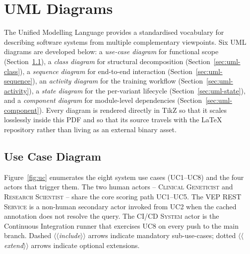 \documentclass[11pt,a4paper,oneside]{report}
\begin{document}
\section{UML Diagrams}
\label{sec:an-uml}

The Unified Modelling Language \citep{fowler2004uml}
provides a standardised vocabulary for describing
software systems from multiple complementary viewpoints.
Six UML diagrams are developed below: a \emph{use-case
diagram} for functional scope
(Section~\ref{sec:uml-usecase}), a \emph{class diagram}
for structural decomposition
(Section~\ref{sec:uml-class}), a \emph{sequence diagram}
for end-to-end interaction
(Section~\ref{sec:uml-sequence}), an \emph{activity
diagram} for the training workflow
(Section~\ref{sec:uml-activity}), a \emph{state diagram}
for the per-variant lifecycle (Section~\ref{sec:uml-state}),
and a \emph{component diagram} for module-level
dependencies (Section~\ref{sec:uml-component}). Every
diagram is rendered directly in TikZ so that it scales
losslessly inside this PDF and so that its source
travels with the LaTeX repository rather than living as
an external binary asset.

\subsection{Use Case Diagram}
\label{sec:uml-usecase}

Figure~\ref{fig:uc} enumerates the eight system use cases
(UC1--UC8) and the four actors that trigger them. The two
human actors -- \textsc{Clinical Geneticist} and
\textsc{Research Scientist} -- share the core scoring path
UC1--UC5. The \textsc{VEP REST Service} is a
non-human secondary actor invoked from UC2 when the
cached annotation does not resolve the query. The
\textsc{CI/CD System} actor is the Continuous Integration
runner that exercises UC8 on every push to the main
branch. Dashed \emph{$\langle\!\langle$include$\rangle\!\rangle$}
arrows indicate mandatory sub-use-cases; dotted
\emph{$\langle\!\langle$extend$\rangle\!\rangle$} arrows
indicate optional extensions.
\end{document}
